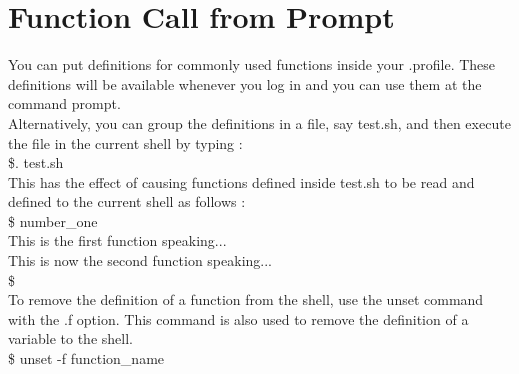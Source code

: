 \documentclass{article}
\begin{document}
\section*{Function Call from Prompt}
You can put definitions for commonly used functions inside your .profile. These definitions will be available whenever you log in and you can use them at the command prompt.\\
Alternatively, you can group the definitions in a file, say test.sh, and then execute the file in the current shell by typing :\\
\$. test.sh\\
This has the effect of causing functions defined inside test.sh to be read and defined to the current shell as follows :\\
\$ number\_one\\
This is the first function speaking...\\
This is now the second function speaking...\\
\$\\
To remove the definition of a function from the shell, use the unset command with the .f option. This command is also used to remove the definition of a variable to the shell.\\
\$ unset -f function\_name\\
\end{document}
